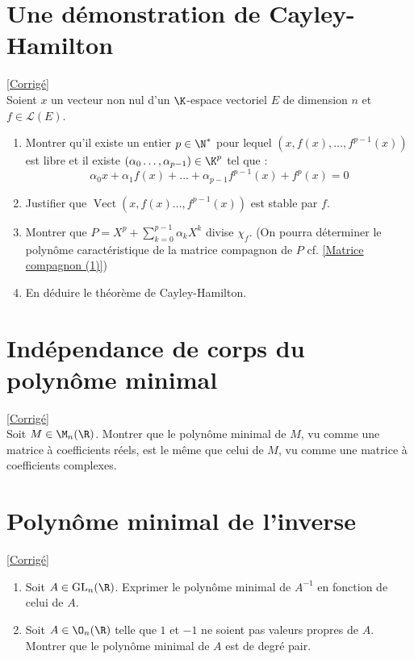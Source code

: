 \documentclass[8pt]{book}
\begin{document}
	\section{Une démonstration de Cayley-Hamilton }
	\label{Une démonstration de Cayley_Hamilton}
	\textcolor{blue}{\hyperref[Une démonstration de Cayley-Hamilton corrigé]{[Corrigé]}}\\
	Soient $x$ un vecteur non nul d'un $\K$-espace vectoriel $E$ de dimension $n$ et $f\in \mathcal{L}(E)$.
	\begin{enumerate}
		\item Montrer qu'il existe un entier $p\in \N^*$ pour lequel $(x,f(x),\dots,f^{p-1}(x))$ est libre et il existe $(\alpha_0\dots,\alpha_{p-1})\in \K^p$ tel que :
		$$\alpha_0x+\alpha_1f(x)+\dots+\alpha_{p-1}f^{p-1}(x)+f^p(x)=0$$
		\item Justifier que $\operatorname{Vect}(x,f(x)\dots,f^{p-1}(x))$ est stable par $f$.
		\item Montrer que $P=X^p+\displaystyle\sum\limits_{k=0}^{p-1}{\alpha_kX^k}$ divise $\chi_f$. (On pourra déterminer le polynôme caractéristique de la matrice compagnon de $P$ cf. \ref{Matrice compagnon (1)})
		\item En déduire le théorème de Cayley-Hamilton.
	\end{enumerate}
	
	\section{Indépendance de corps du polynôme minimal }
	\label{Indépendance de corps du polynôme minimal}
	\textcolor{blue}{\hyperref[Indépendance de corps du polynôme minimal corrigé]{[Corrigé]}}\\
	Soit $M\in \M_n(\R)$. Montrer que le polynôme minimal de $M$, vu comme une matrice à coefficients réels, est le même que celui de $M$, vu comme une matrice à coefficients complexes.
	
	\section{Polynôme minimal de l'inverse }
	\label{Polynôme minimal de l'inverse}
	\textcolor{blue}{\hyperref[Polynôme minimal de l'inverse corrigé]{[Corrigé]}}\\
	\begin{enumerate}[leftmargin=*]
		\item Soit $A\in \text{GL}_n(\R)$. Exprimer le polynôme minimal de $A^{-1}$ en fonction de celui de $A$.
		\item Soit $A\in \O_n(\R)$ telle que $1$ et $-1$ ne soient pas valeurs propres de $A$. Montrer que le polynôme minimal de $A$ est de degré pair.
	\end{enumerate}
	
\end{document}
